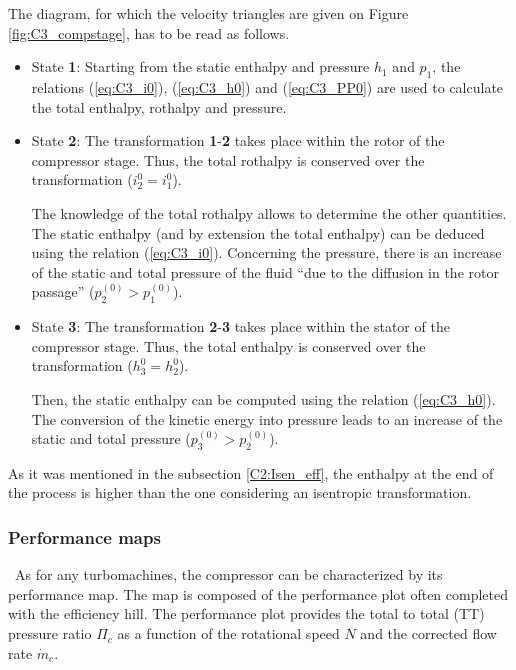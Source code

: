 The diagram, for which the velocity triangles are given on Figure \ref{fig:C3_compstage}, has to be read as follows.
\begin{itemize}
    \item State \textbf{1}: Starting from the static enthalpy and pressure \(h_1\) and \(p_1\), the relations (\ref{eq:C3_i0}), (\ref{eq:C3_h0}) and (\ref{eq:C3_PP0}) are used to calculate the total enthalpy, rothalpy and pressure.
    \item State \textbf{2}: The transformation \textbf{1}-\textbf{2} takes place within the rotor of the compressor stage. Thus, the total rothalpy is conserved over the transformation ($i_2^0=i_1^0$).

          The knowledge of the total rothalpy allows to determine the other quantities. The static enthalpy (and by extension the total enthalpy) can be deduced using the relation (\ref{eq:C3_i0}). Concerning the pressure, there is an increase of the static and total pressure of the fluid “due to the diffusion in the rotor passage” \cite{Hillewaert2019} ($p_2^{(0)} > p_1^{(0)}$).

    \item State \textbf{3}: The transformation \textbf{2}-\textbf{3} takes place within the stator of the compressor stage. Thus, the total enthalpy is conserved over the transformation ($h_3^0 = h_2^0$).

          Then, the static enthalpy can be computed using the relation (\ref{eq:C3_h0}). The conversion of the kinetic energy into pressure leads to an increase of the static and total pressure ($p_3^{(0)} > p_2^{(0)}$).
\end{itemize}
As it was mentioned in the subsection \ref{C2:Isen_eff}, the enthalpy at the end of the process is higher than the one considering an isentropic transformation.
\subsubsection{Performance maps}
\quad\ As for any turbomachines, the compressor can be characterized by its performance map. The map is composed of the performance plot often completed with the efficiency hill. The performance plot provides the total to total (TT) pressure ratio \(\Pi_c\) as a function of the rotational speed \(N\) and the corrected flow rate \(\dot{m}_c\).

